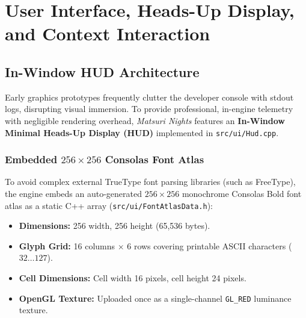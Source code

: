 \chapter{User Interface, Heads-Up Display, and Context Interaction}
\label{chap:hud}

\section{In-Window HUD Architecture}
Early graphics prototypes frequently clutter the developer console with stdout logs, disrupting visual immersion. To provide professional, in-engine telemetry with negligible rendering overhead, \textit{Matsuri Nights} features an \textbf{In-Window Minimal Heads-Up Display (HUD)} implemented in \texttt{src/ui/Hud.cpp}.

\subsection{Embedded \texorpdfstring{$256\times 256$}{256x256} Consolas Font Atlas}
To avoid complex external TrueType font parsing libraries (such as FreeType), the engine embeds an auto-generated $256 \times 256$ monochrome Consolas Bold font atlas as a static C++ array (\texttt{src/ui/FontAtlasData.h}):
\begin{itemize}
    \item \textbf{Dimensions:} 256 width, 256 height (65,536 bytes).
    \item \textbf{Glyph Grid:} 16 columns $\times$ 6 rows covering printable ASCII characters ($32 \dots 127$).
    \item \textbf{Cell Dimensions:} Cell width 16 pixels, cell height 24 pixels.
    \item \textbf{OpenGL Texture:} Uploaded once as a single-channel \texttt{GL\_RED} luminance texture.
\end{itemize}

